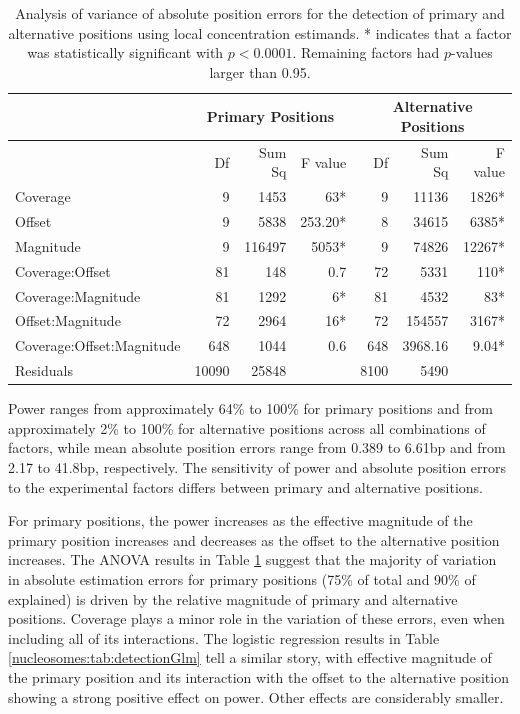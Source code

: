 \begin{table}
\centering
\caption{Analysis of variance of absolute position errors for the detection
of primary and alternative positions using local concentration estimands.
{*} indicates that a factor was statistically significant with $p<0.0001$.
Remaining factors had $p$-values larger than 0.95.
\label{nucleosomes:tab:detectionAnova}}
\begin{tabular}{l|rrr|rrr}
\hline 
 & \multicolumn{3}{c|}{Primary Positions} & \multicolumn{3}{c}{Alternative Positions}\tabularnewline
\hline 
 & Df  & Sum Sq  & F value  & Df  & Sum Sq  & F value \tabularnewline
\hline 
Coverage & 9  & 1453  & 63{*} & 9  & 11136  & 1826{*} \tabularnewline
Offset  & 9  & 5838  & 253.20{*}  & 8  & 34615  & 6385{*} \tabularnewline
Magnitude  & 9  & 116497  & 5053{*}  & 9  & 74826  & 12267{*} \tabularnewline
Coverage:Offset  & 81  & 148  & 0.7\phantom{*}  & 72  & 5331  & 110{*} \tabularnewline
Coverage:Magnitude  & 81  & 1292  & 6{*}  & 81  & 4532  & 83{*} \tabularnewline
Offset:Magnitude  & 72  & 2964  & 16{*} & 72  & 154557  & 3167{*} \tabularnewline
Coverage:Offset:Magnitude  & 648  & 1044  & 0.6\phantom{*}  & 648  & 3968.16  & 9.04{*} \tabularnewline
Residuals  & 10090  & 25848  &  & 8100  & 5490  & \tabularnewline
\hline 
\end{tabular}
\end{table}
\fi

Power ranges from approximately 64\% to 100\% for primary positions and from approximately 2\% to 100\% for alternative positions across all combinations of factors, while mean absolute position errors range from 0.389 to 6.61bp and from 2.17 to 41.8bp, respectively.
The sensitivity of power and absolute position errors to the experimental factors differs between primary and alternative positions.

For primary positions, the power increases as the effective magnitude of the primary position increases and decreases as the offset to the alternative position increases.
The ANOVA results in Table \ref{nucleosomes:tab:detectionAnova} suggest that the majority of variation in absolute estimation errors for primary positions (75\% of total and 90\% of explained) is driven by the relative magnitude of primary and alternative positions.
Coverage plays a minor role in the variation of these errors, even when including all of its interactions.
The logistic regression results in Table \ref{nucleosomes:tab:detectionGlm} tell a similar story, with effective magnitude of the primary position and its interaction with the offset to the alternative position showing a strong positive effect on power.
Other effects are considerably smaller.


